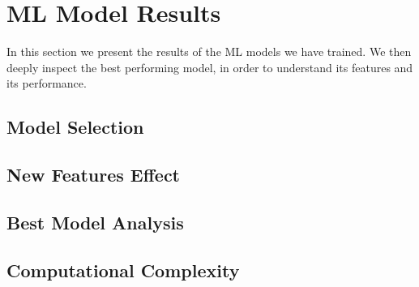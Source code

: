 \section{ML Model Results}
\label{sec:results_ML}
In this section we present the results of the ML models we have trained. We then deeply inspect the best performing model, 
in order to understand its features and its performance.



\subsection{Model Selection}
\label{subsec:results_ML_model_selection}




\subsection{New Features Effect}




\subsection{Best Model Analysis}



\subsection{Computational Complexity}
